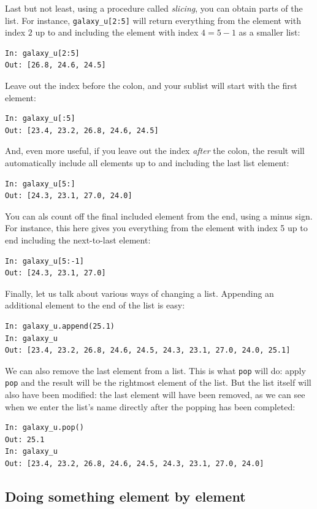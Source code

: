\documentclass[twocolumn,apj]{openjournal}
\begin{document}
Last but not least, using a procedure called {\em slicing}, you can obtain parts of the list. For instance, \verb|galaxy_u[2:5]| will return everything from the element with index $2$ up to and including the element with index $4=5-1$ as a smaller list:
\begin{lstlisting}
In: galaxy_u[2:5]
Out: [26.8, 24.6, 24.5]
\end{lstlisting}
Leave out the index before the colon, and your sublist will start with the first element:
\begin{lstlisting}
In: galaxy_u[:5]
Out: [23.4, 23.2, 26.8, 24.6, 24.5]
\end{lstlisting}
And, even more useful, if you leave out the index {\em after} the colon, the result will automatically include all elements up to and including the last list element:
\begin{lstlisting}
In: galaxy_u[5:]
Out: [24.3, 23.1, 27.0, 24.0]
\end{lstlisting}
You can als count off the final included element from the end, using a minus sign. For instance, this here gives you everything from the element with index 5 up to end including the next-to-last element:
\begin{lstlisting}
In: galaxy_u[5:-1]
Out: [24.3, 23.1, 27.0]
\end{lstlisting}

Finally, let us talk about various ways of changing a list. Appending an additional element to the end of the list is easy:
\begin{lstlisting}
In: galaxy_u.append(25.1)
In: galaxy_u
Out: [23.4, 23.2, 26.8, 24.6, 24.5, 24.3, 23.1, 27.0, 24.0, 25.1]
\end{lstlisting}
We can also remove the last element from a list. This is what \verb|pop| will do: apply \verb|pop| and the result will be the rightmost element of the list. But the list itself will also have been modified: the last element will have been removed, as we can see when we enter the list's name directly after the popping has been completed:
\begin{lstlisting}
In: galaxy_u.pop()
Out: 25.1
In: galaxy_u
Out: [23.4, 23.2, 26.8, 24.6, 24.5, 24.3, 23.1, 27.0, 24.0]
\end{lstlisting}

\subsection{Doing something element by element}
\end{document}

